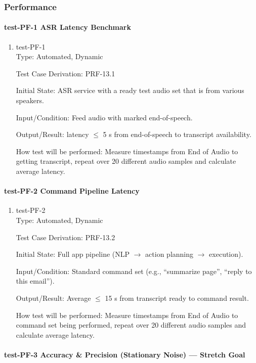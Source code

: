 \documentclass[12pt, titlepage]{article}
\begin{document}
\subsubsection{Performance}

\paragraph{test-PF-1 ASR Latency Benchmark}

\begin{enumerate}
\item{test-PF-1\\}
Type: Automated, Dynamic

Test Case Derivation: PRF-13.1

Initial State: ASR service with a ready test audio set that is from various speakers.

Input/Condition: Feed audio with marked end-of-speech.

Output/Result: latency $\leq$ 5 s from end-of-speech to transcript availability.

How test will be performed: Measure timestamps from End of Audio to getting transcript, repeat over 20 different audio samples and calculate average latency.
\end{enumerate}

\paragraph{test-PF-2 Command Pipeline Latency}

\begin{enumerate}
\item{test-PF-2\\}
Type: Automated, Dynamic

Test Case Derivation: PRF-13.2

Initial State: Full app pipeline (NLP $\rightarrow$ action planning $\rightarrow$ execution).

Input/Condition: Standard command set (e.g., “summarize page”, “reply to this email”).

Output/Result: Average $\leq$ 15 s from transcript ready to command result.

How test will be performed: Measure timestamps from End of Audio to command set being performed, repeat over 20 different audio samples and calculate average latency.
\end{enumerate}

\paragraph{test-PF-3 Accuracy \& Precision (Stationary Noise) — Stretch Goal}
\end{document}
